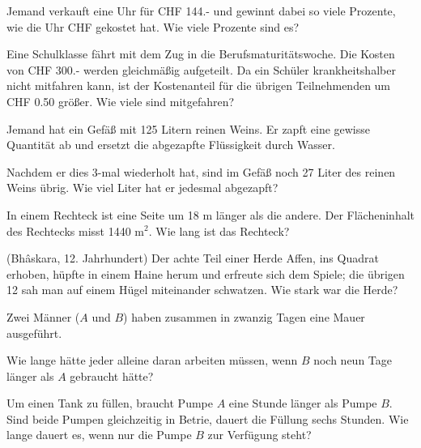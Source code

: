 \begin{bbwAufgabenBlock}

\item Jemand verkauft eine Uhr für CHF 144.- und gewinnt dabei so
viele Prozente, wie die Uhr CHF gekostet hat. Wie viele Prozente sind
es?


\item Eine  Schulklasse fährt mit dem Zug in die Berufsmaturitätswoche.
Die Kosten von CHF 300.- werden gleichmäßig aufgeteilt. Da ein Schüler
krankheitshalber nicht mitfahren kann, ist der Kostenanteil für die
übrigen Teilnehmenden um CHF 0.50 größer. Wie viele sind mitgefahren?


\item  Jemand hat ein Gefäß mit 125 Litern reinen Weins. Er zapft eine
gewisse Quantität ab und ersetzt die abgezapfte Flüssigkeit durch
Wasser.

Nachdem er dies 3-mal wiederholt hat, sind im Gefäß noch 27 Liter des
reinen Weins übrig. Wie viel Liter hat er jedesmal abgezapft?



\item In einem Rechteck ist eine Seite um 18 m länger als die andere.
Der Flächeninhalt des Rechtecks misst 1440 $\text{m}^2$. Wie lang ist das Rechteck?


\item (Bhâskara, 12. Jahrhundert) Der achte Teil einer Herde Affen,
ins Quadrat erhoben, hüpfte in einem Haine herum und erfreute sich dem
Spiele; die übrigen 12 sah man auf einem Hügel miteinander
schwatzen. Wie stark war die Herde?



\item Zwei Männer ($A$ und $B$) haben zusammen in zwanzig Tagen eine Mauer
ausgeführt.

Wie lange hätte jeder alleine daran arbeiten müssen, wenn $B$ noch neun Tage
länger als $A$ gebraucht hätte?


\item Um einen Tank zu füllen, braucht Pumpe $A$ eine Stunde länger als
Pumpe $B$. Sind beide Pumpen gleichzeitig in Betrie, dauert die
Füllung sechs Stunden. Wie lange dauert es, wenn nur die Pumpe $B$ zur
Verfügung steht?


\end{bbwAufgabenBlock}
